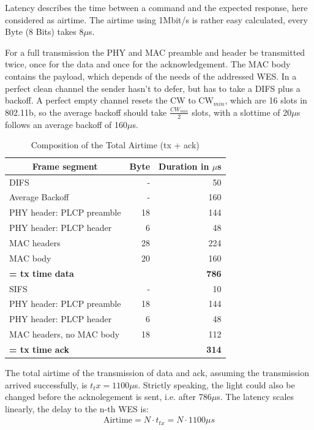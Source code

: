 Latency describes the time between a command and the expected response, here considered as airtime.
The airtime using 1Mbit/s is rather easy calculated, every Byte (8 Bits) takes 8$\mu$s.

For a full transmission the PHY and MAC preamble and header be transmitted twice, once for the data and once for the acknowledgement.
The MAC body contains the payload, which depends of the needs of the addressed \ac{WES}.
In a perfect clean channel the sender hasn't to defer, but has to take a \ac{DIFS} plus a backoff.
A perfect empty channel resets the CW to CW$_{min}$, which are 16 slots in 802.11b,
so the average backoff should take $\frac{CW_{min}}{2}$ slots, with a slottime of 20$\mu$s follows an average backoff of 160$\mu$s.

\begin{table}[h]
	\centering
	\begin{tabular} { lrr }
		\toprule
		\multicolumn{1}{c}{Frame segment}
		& \multicolumn{1}{c}{Byte}
		& \multicolumn{1}{c}{Duration in $\mu$s} \\
		\midrule
		DIFS								& -		& 50 \\
		Average Backoff						& -		& 160 \\
		PHY header: PLCP preamble			& 18	& 144 \\
		PHY header: PLCP header				& 6 	& 48 \\
		MAC headers							& 28	& 224 \\
		MAC body							& 20 	& 160 \\
		\textbf{= tx time data}				& 		& \textbf{786} \\
		SIFS								& -		& 10 \\
		PHY header: PLCP preamble			& 18	& 144 \\
		PHY header: PLCP header				& 6		& 48 \\
		MAC headers, no MAC body	 		& 18	& 112 \\
		\textbf{= tx time ack}				& 		& \textbf{314} \\
		\bottomrule
	\end{tabular}
	\caption{Composition of the Total Airtime (tx + ack)}
	\label{tab:airtime_unicast_calc}
\end{table}

The total airtime of the transmission of data and ack, assuming the transmission arrived successfully, is $t_tx=1100\mu$s.
Strictly speaking, the light could also be changed before the acknolegement is sent, i.e. after 786$\mu$s.
The latency scales linearly, the delay to the n-th WES is:
\begin{align}
	\text{Airtime} = N \cdot t_{tx} = N \cdot 1100\mu s
\end{align}

